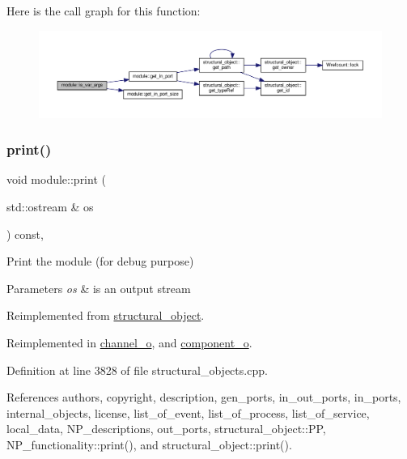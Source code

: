 Here is the call graph for this function\+:
\nopagebreak
\begin{figure}[H]
\begin{center}
\leavevmode
\includegraphics[width=350pt]{d0/dd3/classmodule_ab08265f8bbd3fd2ce9abaf1fc4039044_cgraph}
\end{center}
\end{figure}
\mbox{\label{classmodule_a91f3995762c61b4bc46bd0520d72dc0a}} 
\subsubsection{\texorpdfstring{print()}{print()}}
{\footnotesize\ttfamily void module\+::print (\begin{DoxyParamCaption}\item[{std\+::ostream \&}]{os }\end{DoxyParamCaption}) const\hspace{0.3cm}{\ttfamily [override]}, {\ttfamily [virtual]}}



Print the module (for debug purpose) 


\begin{DoxyParams}{Parameters}
{\em os} & is an output stream \\
\hline
\end{DoxyParams}


Reimplemented from \hyperlink{classstructural__object_a6770e169cf00f814a35b2939ec8f92eb}{structural\+\_\+object}.



Reimplemented in \hyperlink{classchannel__o_ad3730f48e78b2404ab9acacf200cef73}{channel\+\_\+o}, and \hyperlink{classcomponent__o_af842a5ea3400ce76c5fa2b9b33bcbf12}{component\+\_\+o}.



Definition at line 3828 of file structural\+\_\+objects.\+cpp.



References authors, copyright, description, gen\+\_\+ports, in\+\_\+out\+\_\+ports, in\+\_\+ports, internal\+\_\+objects, license, list\+\_\+of\+\_\+event, list\+\_\+of\+\_\+process, list\+\_\+of\+\_\+service, local\+\_\+data, N\+P\+\_\+descriptions, out\+\_\+ports, structural\+\_\+object\+::\+PP, N\+P\+\_\+functionality\+::print(), and structural\+\_\+object\+::print().



